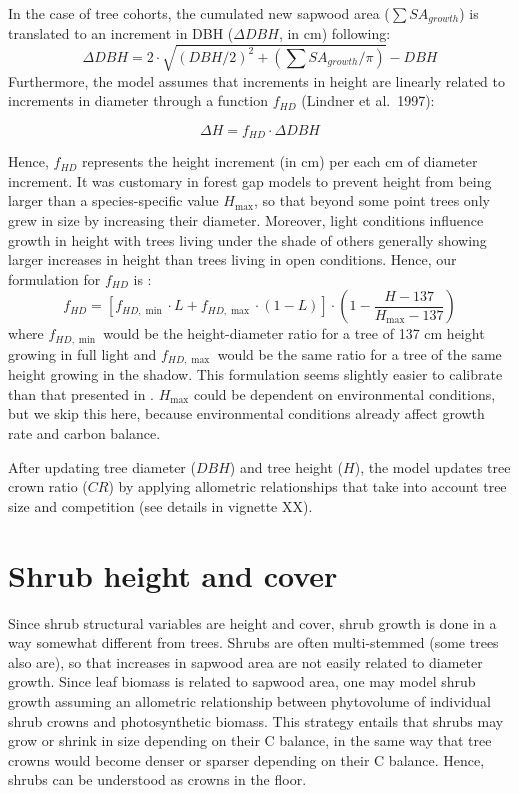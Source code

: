 \documentclass[]{book}
\begin{document}
In the case of tree cohorts, the cumulated new sapwood area (\(\sum{SA_{growth}}\)) is translated to an increment in DBH (\(\Delta DBH\), in cm) following:
\begin{equation}
\Delta DBH = 2 \cdot \sqrt{(DBH/2)^2+(\sum{SA_{growth}}/\pi)} - DBH
\end{equation}
Furthermore, the model assumes that increments in height are linearly related to increments in diameter through a function \(f_{HD}\) (Lindner et al.~1997):

\begin{equation}
\Delta H = f_{HD} \cdot \Delta DBH
\end{equation}

Hence, \(f_{HD}\) represents the height increment (in cm) per each cm of diameter increment. It was customary in forest gap models to prevent height from being larger than a species-specific value \(H_{\max}\), so that beyond some point trees only grew in size by increasing their diameter. Moreover, light conditions influence growth in height with trees living under the shade of others generally showing larger increases in height than trees living in open conditions. Hence, our formulation for \(f_{HD}\) is \citep{Lindner1997, Rasche2012}:
\begin{equation}
f_{HD} = \left[f_{HD,\min} \cdot L + f_{HD,\max} \cdot (1-L) \right] \cdot \left( 1 - \frac{H-137}{H_{\max} - 137} \right)
\end{equation}
where \(f_{HD,\min}\) would be the height-diameter ratio for a tree of 137 cm height growing in full light and \(f_{HD,\max}\) would be the same ratio for a tree of the same height growing in the shadow. This formulation seems slightly easier to calibrate than that presented in \citet{Rasche2012}. \(H_{\max}\) could be dependent on environmental conditions, but we skip this here, because environmental conditions already affect growth rate and carbon balance.

After updating tree diameter (\(DBH\)) and tree height (\(H\)), the model updates tree crown ratio (\(CR\)) by applying allometric relationships that take into account tree size and competition (see details in vignette XX).

\hypertarget{shrub-height-and-cover}{%
\section{Shrub height and cover}\label{shrub-height-and-cover}}

Since shrub structural variables are height and cover, shrub growth is done in a way somewhat different from trees. Shrubs are often multi-stemmed (some trees also are), so that increases in sapwood area are not easily related to diameter growth. Since leaf biomass is related to sapwood area, one may model shrub growth assuming an allometric relationship between phytovolume of individual shrub crowns and photosynthetic biomass. This strategy entails that shrubs may grow or shrink in size depending on their C balance, in the same way that tree crowns would become denser or sparser depending on their C balance. Hence, shrubs can be understood as crowns in the floor.
\end{document}
